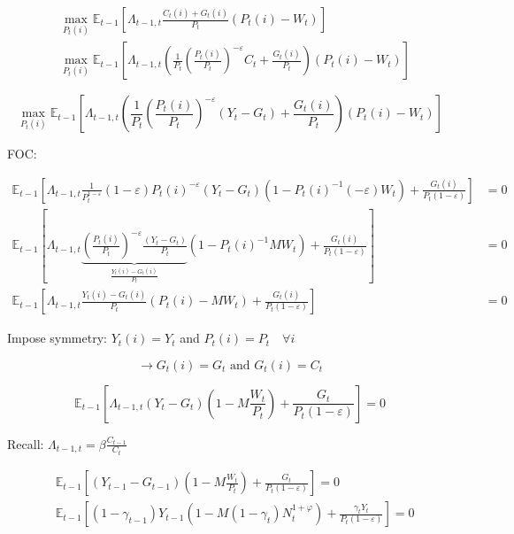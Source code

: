 {\begin{enumerate}[label=(\arabic*)]
{$$
\begin{aligned}
& \max _{P_{t}(i)} \mathbb{E}_{t-1}\left[\Lambda_{t-1, t} \frac{C_{t}(i)+G_{t}(i)}{P_{t}}\left(P_{t}(i)-W_{t}\right)\right] \\
& \max _{P_{t}(i)} \mathbb{E}_{t-1}\left[\Lambda_{t-1, t}\left(\frac{1}{P_{t}}\left(\frac{P_{t}(i)}{P_{t}}\right)^{-\varepsilon} C_{t}+\frac{G_{t}(i)}{P_{t}}\right)\left(P_{t}(i)-W_{t}\right)\right]
\end{aligned}
$$

$$
\max _{P_{t}(i)}\mathbb{E}_{t-1}\left[\Lambda_{t-1, t}\left(\frac{1}{P_{t}}\left(\frac{P_{t}(i)}{P_{t}}\right)^{-\varepsilon}\left(Y_{t}-G_{t}\right)+\frac{G_{t}(i)}{P_{t}}\right)\left(P_{t}(i)-W_{t}\right)\right]
$$

FOC:

\begin{align*}
\mathbb{E}_{t-1}\left[\Lambda_{t-1, t} \frac{1}{P_{t}^{1-\varepsilon}}(1-\varepsilon) P_{t}(i)^{-\varepsilon}\left(Y_{t}-G_{t}\right)\left(1-P_{t}(i)^{-1}(-\varepsilon) W_{t}\right)+\frac{G_{t}(i)}{P_{t}(1-\varepsilon)}\right] &= 0 \\
\mathbb{E}_{t-1}\left[\Lambda_{t-1, t}\underbrace{\left(\frac{P_t(i)}{P_t}\right)^{-\varepsilon} \frac{\left(Y_t-G_t\right)}{P_t}}_{\frac{Y_t(i)-G_t(i)}{P_t}}\left(1-P_t(i)^{-1} M W_t\right)+\frac{G_t(i)}{P_t(1-\varepsilon)}\right] &= 0 \\
\mathbb{E}_{t-1}\left[\Lambda_{t-1, t} \frac{Y_{t}(i)-G_{t}(i)}{P_{t}}\left(P_{t}(i)-M W_{t}\right)+\frac{G_{t}(i)}{P_{t}(1-\varepsilon)}\right] &= 0
\end{align*}


Impose symmetry: $Y_{t}(i)=Y_{t}$ and $P_{t}(i)=P_{t} \quad \forall i$

$$
\longrightarrow G_{t}(i)=G_{t} \text { and } G_{t}(i)=C_{t}
$$

$$
\mathbb{E}_{t-1}\left[\Lambda_{t-1, t}\left(Y_{t}-G_{t}\right)\left(1-M \frac{W_{t}}{P_{t}}\right)+\frac{G_{t}}{P_{t}(1-\varepsilon)}\right]=0
$$

Recall: $\Lambda_{t-1, t}=\beta \frac{C_{t-1}}{C_{t}}$

$$
\begin{aligned}
& \mathbb{E}_{t-1}\left[\left(Y_{t-1}-G_{t-1}\right)\left(1-M \frac{W_{t}}{P_{t}}\right)+\frac{G_{t}}{P_{t}(1-\varepsilon)}\right]=0 \\
& \mathbb{E}_{t-1}\left[\left(1-\gamma_{t-1}\right) Y_{t-1}\left(1-M\left(1-\gamma_{t}\right) N_{t}^{1+\varphi}\right)+\frac{\gamma_{t} Y_{t}}{P_{t}(1-\varepsilon)}\right]=0
\end{aligned}
$$
}
\end{enumerate}
}
